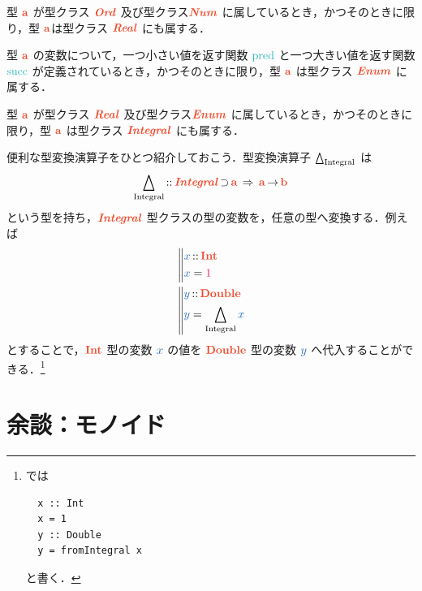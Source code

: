 \documentclass[a5paper,twoside,fleqn,draft]{jsbook}
\begin{document}
型 $\mA$ が型クラス $\mOrdTypeClass$ 及び型クラス$\mNumTypeClass$ に属しているとき，かつそのときに限り，型 $\mA$は型クラス $\mRealTypeClass$ にも属する．

型 $\mA$ の変数について，一つ小さい値を返す関数 $\mPred$ と一つ大きい値を返す関数 $\mSucc$ が定義されているとき，かつそのときに限り，型 $\mA$ は型クラス $\mEnumTypeClass$ に属する．

型 $\mA$ が型クラス $\mRealTypeClass$ 及び型クラス$\mEnumTypeClass$ に属しているとき，かつそのときに限り，型 $\mA$ は型クラス $\mIntegralTypeClass$ にも属する．


\separator

便利な型変換演算子をひとつ紹介しておこう．型変換演算子
$\operatorname{\bigtriangleup_\text{Integral}}$ は
\begin{equation}
  \mFromIntegral
  \mIn{}\mIntegralTypeClass\mSuperSet\mA
  \mSuperClass\mA\mFuncArrow\mB
\end{equation}
という型を持ち，$\mIntegralTypeClass$ 型クラスの型の変数を，任意の型へ変換する．例えば
\begin{align}
  {}
  &\left\mBrace
  \begin{aligned}
    \hVar{x}
    &\mIn\mIntType\\
    \hVar{x}
    &=\hConstant{1}
  \end{aligned}
  \right.\\
    {}
    &\left\mBrace
    \begin{aligned}
      \hVar{y}
      &\mIn\mDoubleType\\
      \hVar{y}
      &=\mFromIntegral\hVar{x}
    \end{aligned}
  \right.
\end{align}
とすることで，$\mIntType$ 型の変数 $\hVar{x}$ の値を $\mDoubleType$ 型の変数 $\hVar{y}$ へ代入することができる．\footnote{\haskell では
\begin{verbatim}
  x :: Int
  x = 1
  y :: Double
  y = fromIntegral x
\end{verbatim}
と書く．}

\separator


\section{余談：モノイド}
\end{document}
